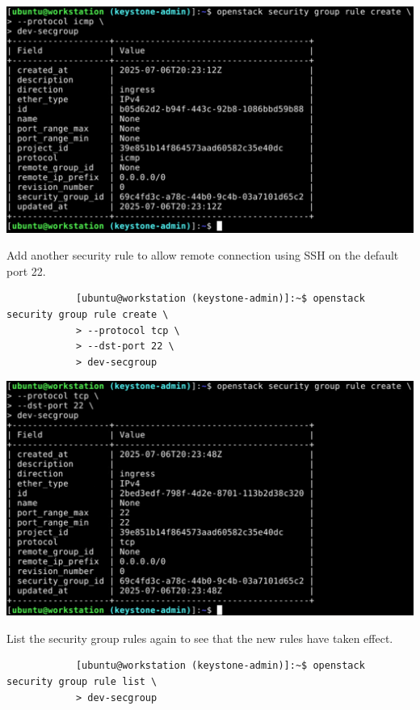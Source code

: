 \documentclass[letterpaper, 12pt]{article}
\begin{document}
\begin{enumerate}
\begin{labstep}
        \begin{center}
            \includegraphics[width=\linewidth]{images/part1/step28.png}
        \end{center}
    \end{labstep}

    \begin{labstep}
        Add another security rule to allow remote connection using SSH on the default port 22.
        \begin{lstlisting}
            [ubuntu@workstation (keystone-admin)]:~$ openstack security group rule create \
            > --protocol tcp \
            > --dst-port 22 \
            > dev-secgroup
        \end{lstlisting}

        \begin{center}
            \includegraphics[width=\linewidth]{images/part1/step29.png}
        \end{center}
    \end{labstep}

    \begin{labstep}
        List the security group rules again to see that the new rules have taken effect.
        \begin{lstlisting}
            [ubuntu@workstation (keystone-admin)]:~$ openstack security group rule list \
            > dev-secgroup
        \end{lstlisting}


\end{labstep}
\end{enumerate}
\end{document}

